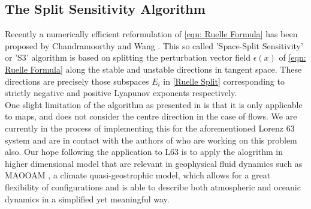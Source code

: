 \subsection{The Split Sensitivity Algorithm}

Recently a numerically efficient reformulation of \ref{eqn: Ruelle Formula} has been proposed by Chandramoorthy and Wang \cite{Chandramoorthy2020}. This so called 'Space-Split Sensitivity' or 'S3' algorithm is based on splitting the perturbation vector field $\epsilon(x)$ of \ref{eqn: Ruelle Formula} along the stable and unstable directions in tangent space. These directions are precisely those subspaces $E_i$ in \ref{Ruelle Split} corresponding to strictly negative and positive Lyapunov exponents respectively.\\

One slight limitation of the algorithm as presented in \cite{Chandramoorthy2020} is that it is only applicable to maps, and does not consider the centre direction in the case of flows. We are currently in the process of implementing this for the aforementioned Lorenz $63$ system and are in contact with the authors of \cite{Chandramoorthy2020} who are working on this problem also. Our hope following the application to L63 is to apply the alogrithm in higher dimensional model that are relevant in geophysical fluid dynamics such as MAOOAM \cite{DeCruz2016}, a climate quasi-geostrophic model, which allows for a great flexibility of configurations and is able to describe both atmospheric and oceanic dynamics in a simplified yet meaningful way.
